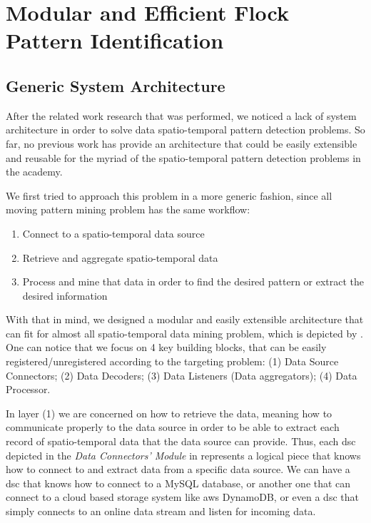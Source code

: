 \chapter{Modular and Efficient Flock Pattern Identification}
\label{chp:solution}
\section{Generic System Architecture}
\label{sec:architecture}
After the related work research that was performed, we noticed a lack of system architecture in order to solve data
spatio-temporal pattern detection problems. So far, no previous work has provide an architecture that could be easily
extensible and reusable for the myriad of the spatio-temporal pattern detection problems in the academy.

We first tried to approach this problem in a more generic fashion, since all moving pattern mining problem has the same
workflow:

\begin{enumerate}
    \item Connect to a spatio-temporal data source
    \item Retrieve and aggregate spatio-temporal data
    \item Process and mine that data in order to find the desired pattern or extract the desired information
\end{enumerate}

With that in mind, we designed a modular and easily extensible architecture that can fit for almost all spatio-temporal
data mining problem, which is depicted by . One can notice that we focus on 4 key building
blocks, that can be easily registered/unregistered according to the targeting problem: (1) Data Source Connectors; (2)
Data Decoders; (3) Data Listeners (Data aggregators); (4) Data Processor.

In layer (1) we are concerned on how to retrieve the data, meaning how to communicate properly to the data source in
order to be able to extract each record of spatio-temporal data that the data source can provide. Thus, each \ac{dsc}
depicted in the \textit{Data Connectors' Module} in  represents a logical piece that knows how
to connect to and extract data from a specific data source. We can have a \ac{dsc} that knows how to connect to a MySQL
database, or another one that can connect to a cloud based storage system like \ac{aws} DynamoDB, or even a \ac{dsc}
that simply connects to an online data stream and listen for incoming data.

